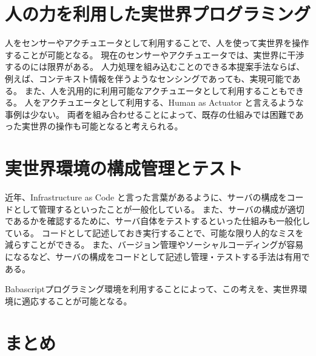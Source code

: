 \section{人の力を利用した実世界プログラミング}\label{ux4ebaux306eux529bux3092ux5229ux7528ux3057ux305fux5b9fux4e16ux754cux30d7ux30edux30b0ux30e9ux30dfux30f3ux30b0}

人をセンサーやアクチュエータとして利用することで、人を使って実世界を操作することが可能となる。
現在のセンサーやアクチュエータでは、実世界に干渉するのには限界がある。
人力処理を組み込むことのできる本提案手法ならば、例えば、コンテキスト情報を伴うようなセンシングであっても、実現可能である。
また、人を汎用的に利用可能なアクチュエータとして利用することもできる。
人をアクチュエータとして利用する、Human as Actuator
と言えるような事例は少ない。
両者を組み合わせることによって、既存の仕組みでは困難であった実世界の操作も可能となると考えられる。

\section{実世界環境の構成管理とテスト}\label{ux5b9fux4e16ux754cux74b0ux5883ux306eux69cbux6210ux7ba1ux7406ux3068ux30c6ux30b9ux30c8}

近年、Infrastructure as Code
と言った言葉があるように、サーバの構成をコードとして管理するといったことが一般化している。
また、サーバの構成が適切であるかを確認するために、サーバ自体をテストするといった仕組みも一般化している。
コードとして記述しておき実行することで、可能な限り人的なミスを減らすことができる。
また、バージョン管理やソーシャルコーディングが容易になるなど、サーバの構成をコードとして記述し管理・テストする手法は有用である。

Babascriptプログラミング環境を利用することによって、この考えを、実世界環境に適応することが可能となる。

\section{まとめ}\label{ux307eux3068ux3081}
